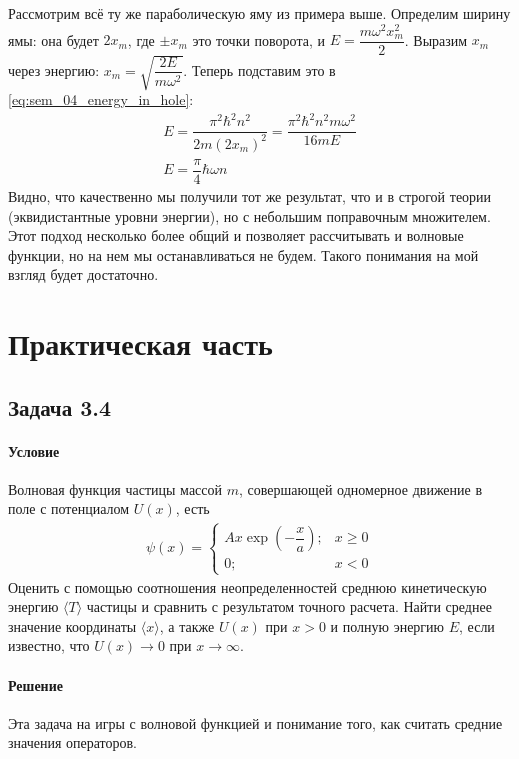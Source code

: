 \documentclass[12pt]{article}
\begin{document}
\vspace{1em} \noindent
Рассмотрим всё ту же параболическую яму из примера выше. Определим ширину ямы: она будет $2x_m$, где $\pm x_m$ это точки поворота, и $E = \dfrac{m\omega^2x_m^2}{2}$. Выразим $x_m$ через энергию: $x_m=\sqrt{\dfrac{2E}{m\omega^2}}$. Теперь подставим это в \ref{eq:sem_04_energy_in_hole}:
\begin{gather*}
    E = \dfrac{\pi^2\hbar^2n^2}{2m(2x_m)^2 } = \dfrac{\pi^2\hbar^2n^2 m\omega^2}{16mE  } \\
    E = \dfrac{\pi}{4}\hbar\omega n
\end{gather*}
Видно, что качественно мы получили тот же результат, что и в строгой теории (эквидистантные уровни энергии), но с  небольшим поправочным множителем. Этот подход несколько более общий и позволяет рассчитывать и волновые функции, но на нем мы останавливаться не будем. Такого понимания на мой взгляд будет достаточно.


\section{Практическая часть}
\subsection{Задача 3.4}
\label{task_3.4}
\paragraph{Условие}
Волновая функция частицы массой $m$, совершающей одномерное движение в поле с потенциалом $U(x)$, есть 
\begin{gather*}
\psi(x) = 
    \begin{cases}
        Ax\exp{\left( -\dfrac{x}{a}\right)}; &x \ge 0\\
        0; &x<0
    \end{cases}
\end{gather*}
Оценить с помощью соотношения неопределенностей среднюю кинетическую энергию $\langle T \rangle$ частицы и сравнить с результатом точного расчета. Найти среднее значение координаты $\langle x \rangle$, а также $U(x)$ при $x>0$ и полную энергию $E$, если известно, что $U(x) \rightarrow 0$ при $x \rightarrow \infty$.

\paragraph{Решение}
Эта задача на игры с волновой функцией и понимание того, как считать средние значения операторов.
\end{document}
